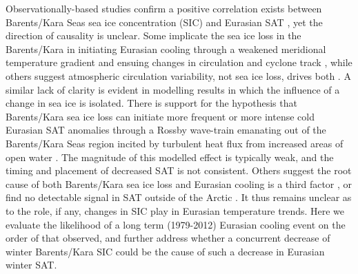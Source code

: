 \documentclass{nature}
\begin{document}


Observationally-based studies confirm a positive correlation exists between Barents/Kara Seas sea ice concentration (SIC) and Eurasian SAT \cite{inoue12,outten12,sato14,sorokina15}, yet the direction of causality is unclear. Some implicate the sea ice loss in the Barents/Kara in initiating Eurasian cooling through a weakened meridional temperature gradient and ensuing changes in circulation and cyclone track \cite{inoue12,outten12}, while others suggest atmospheric circulation variability, not sea ice loss, drives both \cite{sato14,sorokina15}. A similar lack of clarity is evident in modelling results in which the influence of a change in sea ice is isolated. There is support for the hypothesis that Barents/Kara sea ice loss can initiate more frequent or more intense cold Eurasian SAT anomalies through a Rossby wave-train emanating out of the Barents/Kara Seas region incited by turbulent heat flux from increased areas of open water \cite{honda09,petoukhov10,mori14,kim14,peings14,gerber14}. The magnitude of this modelled effect is typically weak, and the timing and placement of decreased SAT is not consistent. Others suggest the root cause of both Barents/Kara sea ice loss and Eurasian cooling is a third factor \cite{sato14,peings14b}, or find no detectable signal in SAT outside of the Arctic \cite{screen14a}. It thus remains unclear as to the role, if any, changes in SIC play in Eurasian temperature trends. Here we evaluate the likelihood of a long term (1979-2012) Eurasian cooling event on the order of that observed, and further address whether a concurrent decrease of winter Barents/Kara SIC could be the cause of such a decrease in Eurasian winter SAT. %
\end{document}

